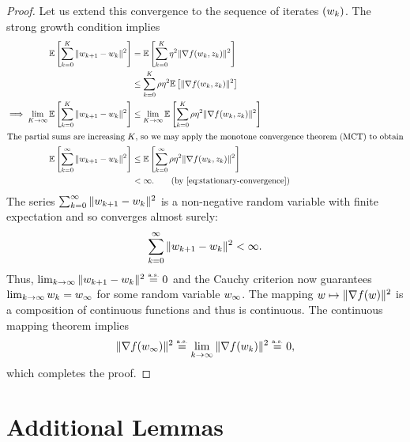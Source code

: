 \begin{proof}
    Let us extend this convergence to the sequence of iterates \( \left(w_k\right) \).
    The strong growth condition implies 
    \begin{align*}
        \E\sbr{\sum_{k=0}^{K} \norm{\wkk - \wk}^2} &= \E\sbr{\sum_{k=0}^{K} \eta^2 \norm{\grad(\wk, \zk)}^2}\\
                                                   &\leq \sum_{k=0}^{K} \sgc \eta^2 \E\sbr{\norm{\grad(\wk, \zk)}^2}\\
        \implies \lim_{K\rightarrow \infty} \E \sbr{\sum_{k=0}^{K} \norm{\wkk - \wk}^2} &\leq \lim_{K\rightarrow\infty} \E \sbr{\sum_{k=0}^{K} \sgc \eta^2 \norm{\grad(\wk, \zk)}^2}\\
        \intertext{The partial sums are increasing \( K \), so we may apply the monotone convergence theorem (MCT) to obtain} 
        \E \sbr{\sum_{k=0}^{\infty} \norm{\wkk - \wk}^2} &\leq  \E \sbr{\sum_{k=0}^{\infty} \sgc \eta^2 \norm{\grad(\wk, \zk)}^2}\\
                                                                  &< \infty. \tag{by \autoref{eq:stationary-convergence}}
    \end{align*}
    The series \(  \sum_{k=0}^{\infty} \|w_{k+1} - w_k\|^2 \) is a non-negative random variable with finite expectation and so converges almost surely: 
    \[ \sum_{k=0}^{\infty} \|w_{k+1} - w_k\|^2 < \infty. \]
    Thus, \( \lim_{k \rightarrow \infty} \|w_{k+1} - w_k\|^2 \stackrel{\text{\rm\tiny a.s.}}{=} 0 \) and the Cauchy criterion now guarantees \( \lim_{k \rightarrow \infty} w_k = w_\infty \) for some random variable \( w_\infty \).
    The mapping \( w \mapsto \|\nabla f(w)\|^2 \) is a composition of continuous functions and thus is continuous. 
    The continuous mapping theorem implies  
    \[ \|\nabla f(w_\infty)\|^2  \stackrel{\text{\rm\tiny a.s.}}{=} \lim_{k\rightarrow \infty} \|\nabla f(w_k)\|^2 \stackrel{\text{\rm\tiny a.s.}}{=} 0, \]
    which completes the proof.
\end{proof}


\section{Additional Lemmas}\label{app:sgd-additional-lemmas}

